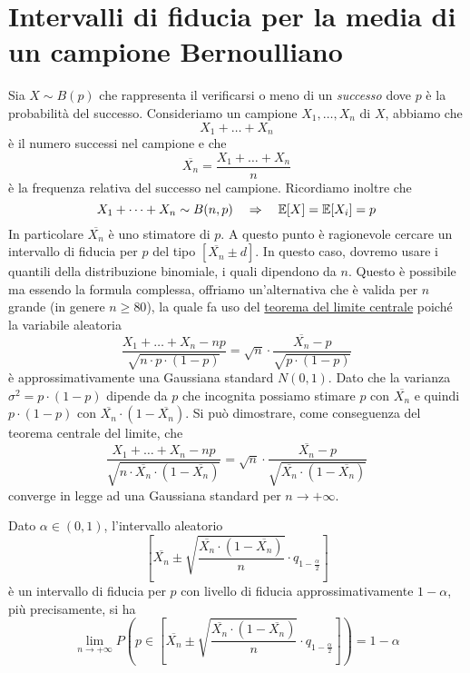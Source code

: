 \section{Intervalli di fiducia per la media di un campione Bernoulliano}
Sia $X \sim B(p)$ che rappresenta il verificarsi o meno di un \emph{successo} dove $p$ è la
probabilità del successo. Consideriamo un campione $X_1, \dots, X_n$ \iid di $X$, abbiamo che
\[ X_1 + \dots + X_n \]
è il numero successi nel campione e che
\[ \overline{X_n} = \frac{X_1 + \dots + X_n}{n} \]
è la frequenza relativa del successo nel campione. Ricordiamo inoltre che
\[ X_1 + \dots + X_n \sim B(n,p) \quad \Rightarrow \quad \mathbb{E}[X] = \mathbb{E}[X_i] = p \]
In particolare $\overline{X_n}$ è uno stimatore di $p$. A questo punto è ragionevole cercare un
intervallo di fiducia per $p$ del tipo $[\overline{X_n} \pm d]$. In questo caso, dovremo usare i
quantili della distribuzione binomiale, i quali dipendono da $n$. Questo è possibile ma essendo
la formula complessa, offriamo un'alternativa che è valida per $n$ grande (in genere $n \geq 80$),
la quale fa uso del \hyperref[th: tlc]{teorema del limite centrale} poiché la variabile aleatoria
\[
	\frac{X_1 + \dots + X_n - np}{\sqrt{n \cdot p \cdot (1-p)}} =
	\sqrt{n} \cdot \frac{\overline{X_n} - p}{\sqrt{p \cdot (1-p)}}
\]
è approssimativamente una Gaussiana standard $N(0,1)$. Dato che la varianza
$\sigma^2 = p \cdot (1-p)$ dipende da $p$ che incognita possiamo stimare $p$ con $\overline{X_n}$
e quindi $p \cdot (1-p)$ con $\overline{X_n} \cdot (1 - \overline{X_n})$. Si può dimostrare, come
conseguenza del teorema centrale del limite, che
\[
	\frac{X_1 + \dots + X_n - np}{\sqrt{n \cdot \overline{X_n} \cdot (1 - \overline{X_n})}} =
	\sqrt{n} \cdot \frac{\overline{X_n} - p}{\sqrt{\overline{X_n} \cdot (1 - \overline{X_n})}}
\]
converge in legge ad una Gaussiana standard per $n \to +\infty$.

\begin{proposition}
	Dato $\alpha \in (0,1)$, l'intervallo aleatorio
	\[
		\left[
			\overline{X_n} \pm \sqrt{\frac{\overline{X_n} \cdot (1 - \overline{X_n})}{n}}
			\cdot q_{1 - \frac{\alpha}{2}}
			\right]
	\]
	è un intervallo di fiducia per $p$ con livello di fiducia approssimativamente $1-\alpha$, più
	precisamente, si ha
	\[
		\lim_{n \to +\infty} P \left( p \in \left[ \overline{X_n} \pm
			\sqrt{\frac{\overline{X_n} \cdot (1 - \overline{X_n})}{n}} \cdot
			q_{1 - \frac{\alpha}{2}} \right] \right) = 1 - \alpha
	\]
\end{proposition}

